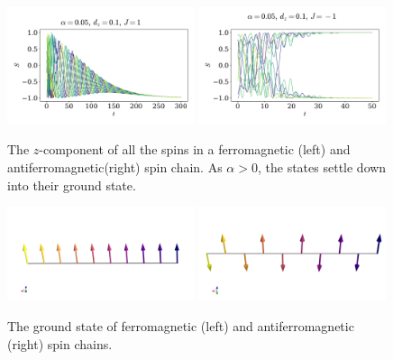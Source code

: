 \documentclass{article}
\begin{document}
    \begin{figure}[H]
        \centering
        \includegraphics[width=0.49\textwidth]{../plots/ground_state_f.pdf}
        \includegraphics[width=0.49\textwidth]{../plots/ground_state_af.pdf}
        \caption{The $z$-component of all the spins in a ferromagnetic (left) and antiferromagnetic(right) spin chain. 
        As $\alpha>0$, the states settle down into their ground state.}
        \label{ground states}
    \end{figure}
    \begin{figure}[H]
        \centering
        \includegraphics[width=0.49\textwidth]{../plots/ground_state_f3D.png}
        \includegraphics[width=0.49\textwidth]{../plots/ground_state_af3D.png}
        \caption{The ground state of ferromagnetic (left) and antiferromagnetic (right) spin chains.}
        \label{ground states 3D}
    \end{figure}
\end{document}
